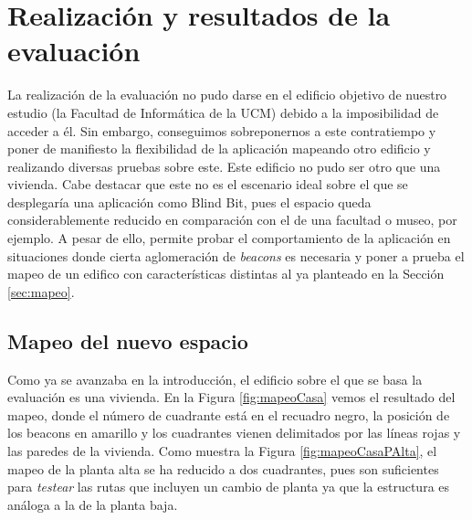 \section{Realización y resultados de la evaluación}

La realización de la evaluación no pudo darse en el edificio objetivo de nuestro estudio (la Facultad de Informática de la UCM) debido a la imposibilidad de acceder a él. Sin embargo, conseguimos sobreponernos a este contratiempo y poner de manifiesto la flexibilidad de la aplicación mapeando otro edificio y realizando diversas pruebas sobre este. Este edificio no pudo ser otro que una vivienda. Cabe destacar que este no es el escenario ideal sobre el que se desplegaría una aplicación como Blind Bit, pues el espacio queda considerablemente reducido en comparación con el de una facultad o museo, por ejemplo. A pesar de ello, permite probar el comportamiento de la aplicación en situaciones donde cierta aglomeración de \textit{beacons} es necesaria y poner a prueba el mapeo de un edifico con características distintas al ya planteado en la Sección \ref{sec:mapeo}.

\subsection{Mapeo del nuevo espacio}

Como ya se avanzaba en la introducción, el edificio sobre el que se basa la evaluación es una vivienda. En la Figura \ref{fig:mapeoCasa} vemos el resultado del mapeo, donde el número de cuadrante está en el recuadro negro, la posición de los beacons en amarillo y los cuadrantes vienen delimitados por las líneas rojas y las paredes de la vivienda. Como muestra la Figura \ref{fig:mapeoCasaPAlta}, el mapeo de la planta alta se ha reducido a dos cuadrantes, pues son suficientes para \textit{testear} las rutas que incluyen un cambio de planta ya que la estructura es análoga a la de la planta baja.


